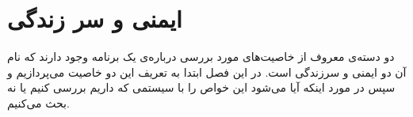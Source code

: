 
\chapter{ایمنی و سر زندگی}

دو دسته‌ی معروف از خاصیت‌های مورد بررسی درباره‌ی یک برنامه وجود دارند که نام آن دو ایمنی و سرزندگی است. در این فصل ابتدا به تعریف این دو خاصیت می‌پردازیم و سپس در مورد اینکه آیا می‌شود این خواص را با سیستمی که داریم بررسی کنیم یا نه بحث می‌کنیم.